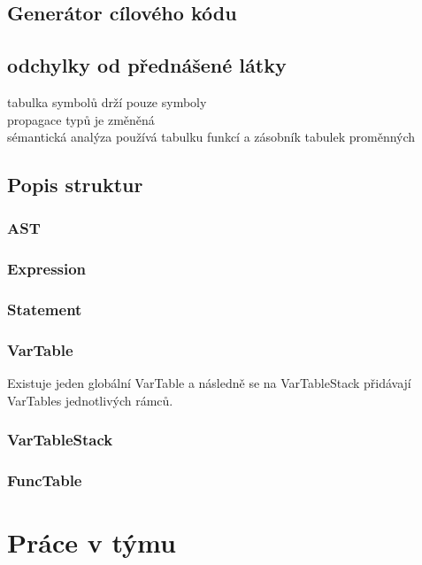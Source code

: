 \documentclass[12pt]{article}
\begin{document}
\subsection{Generátor cílového kódu}


 \subsection{odchylky od přednášené látky}
    tabulka symbolů drží pouze symboly\\
    propagace typů je změněná \\
    sémantická analýza používá tabulku funkcí a zásobník tabulek proměnných\\    

\subsection{Popis struktur}
\subsubsection{AST}

\subsubsection{Expression}

\subsubsection{Statement}

\subsubsection{VarTable}
Existuje jeden globální VarTable a následně se na VarTableStack přidávají VarTables jednotlivých rámců.
\subsubsection{VarTableStack}

\subsubsection{FuncTable}

    
\clearpage

\section{Práce v týmu}
\end{document}

